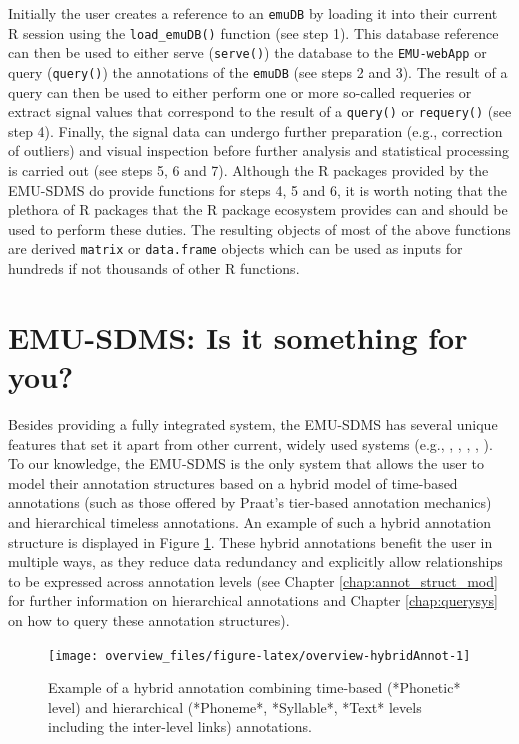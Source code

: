 \documentclass[]{book}
\begin{document}
Initially the user creates a reference to an \texttt{emuDB} by loading it into their current R session using the \texttt{load\_emuDB()} function (see step 1). This database reference can then be used to either serve (\texttt{serve()}) the database to the \texttt{EMU-webApp} or query (\texttt{query()}) the annotations of the \texttt{emuDB} (see steps 2 and 3). The result of a query can then be used to either perform one or more so-called requeries or extract signal values that correspond to the result of a \texttt{query()} or \texttt{requery()} (see step 4). Finally, the signal data can undergo further preparation (e.g., correction of outliers) and visual inspection before further analysis and statistical processing is carried out (see steps 5, 6 and 7). Although the R packages provided by the EMU-SDMS do provide functions for steps 4, 5 and 6, it is worth noting that the plethora of R packages that the R package ecosystem provides can and should be used to perform these duties. The resulting objects of most of the above functions are derived \texttt{matrix} or \texttt{data.frame} objects which can be used as inputs for hundreds if not thousands of other R functions.

\hypertarget{emu-sdms-is-it-something-for-you}{%
\section{EMU-SDMS: Is it something for you?}\label{emu-sdms-is-it-something-for-you}}

Besides providing a fully integrated system, the EMU-SDMS has several unique features that set it apart from other current, widely used systems (e.g., \citet{boersma:2011a}, \citet{wittenburg:2006a}, \citet{fromont:2012a}, \citet{rose:2006a}, \citet{mcauliffe:2016a}). To our knowledge, the EMU-SDMS is the only system that allows the user to model their annotation structures based on a hybrid model of time-based annotations (such as those offered by Praat's tier-based annotation mechanics) and hierarchical timeless annotations. An example of such a hybrid annotation structure is displayed in Figure \ref{fig:overview-hybridAnnot}. These hybrid annotations benefit the user in multiple ways, as they reduce data redundancy and explicitly allow relationships to be expressed across annotation levels (see Chapter \ref{chap:annot_struct_mod} for further information on hierarchical annotations and Chapter \ref{chap:querysys} on how to query these annotation structures).

\begin{figure}

{\centering \texttt{[image: overview\_files/figure-latex/overview-hybridAnnot-1]} 

}

\caption{Example of a hybrid annotation combining time-based (*Phonetic* level) and hierarchical (*Phoneme*, *Syllable*, *Text* levels including the inter-level links) annotations.}\label{fig:overview-hybridAnnot}
\end{figure}
\end{document}
